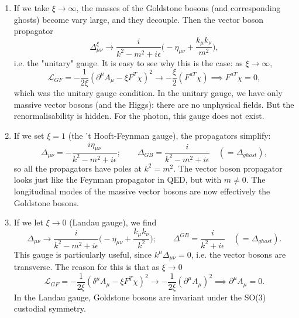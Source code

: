 \begin{enumerate}
\item If we take $\xi \to \infty$, the masses of the Goldstone bosons (and corresponding ghosts) become vary large, and they decouple. Then the vector boson propagator
\begin{equation}
\Delta_{\mu \nu}^\xi \to \frac{i}{k^2 - m^2 + i \epsilon} \bigg(-\eta_{\mu \nu} + \frac{k_\mu k_\nu}{m^2} \bigg),
\end{equation}
i.e. the "unitary" gauge. It is easy to see why this is the case: as $\xi \to \infty$,
\begin{equation}
\mathcal{L}_{GF} = - \frac{1}{2\xi}(\partial^\mu A_\mu - \xi F^T \chi)^2 \to - \frac{\xi}{2}(F^{a T}\chi) \implies F^{aT}\chi = 0,
\end{equation}
which was the unitary gauge condition. In the unitary gauge, we have only massive vector bosons (and the Higgs): there are no unphysical fields. But the renormalisability is hidden. For the photon, this gauge does not exist.
\item If we set $\xi = 1$ (the 't Hooft-Feynman gauge), the propagators simplify:
\begin{equation}
\Delta_{\mu\nu} = - \frac{i\eta_{\mu \nu}}{k^2 - m^2 + i\epsilon}; \qquad \Delta_{GB} = \frac{i}{k^2-m^2 + i\epsilon} \quad (= \Delta_{ghost}),
\end{equation}
so all the propagators have poles at $k^2=m^2$. The vector boson propagator looks just like the Feynman propagator in QED, but with $m \neq 0$. The longitudinal modes of the massive vector bosons are now effectively the Goldstone bosons.
\item If we let $\xi \to 0$ (Landau gauge), we find
\begin{equation}
\Delta_{\mu \nu} \to \frac{i}{k^2 -m^2 + i\epsilon} \bigg(-\eta_{\mu \nu} + \frac{k_\mu k_\nu}{k^2}\bigg); \qquad \Delta^{GB} = \frac{i}{k^2 + i\epsilon} \quad (= \Delta_{ghost}).
\end{equation}
This gauge is particularly useful, since $k^\mu \Delta_{\mu \nu} = 0$, i.e. the vector bosons are transverse. The reason for this is that as $\xi \to 0$
\begin{equation}
\mathcal{L}_{GF} = - \frac{1}{2\xi}(\delta^\mu A_\mu - \xi F^T \chi)^2 \to -\frac{1}{2\xi}(\partial^\mu A_\mu)^2 \implies \partial^\mu A_\mu = 0.
\end{equation}
In the Landau gauge, Goldstone bosons are invariant under the SO(3) custodial symmetry.
\end{enumerate}
%
